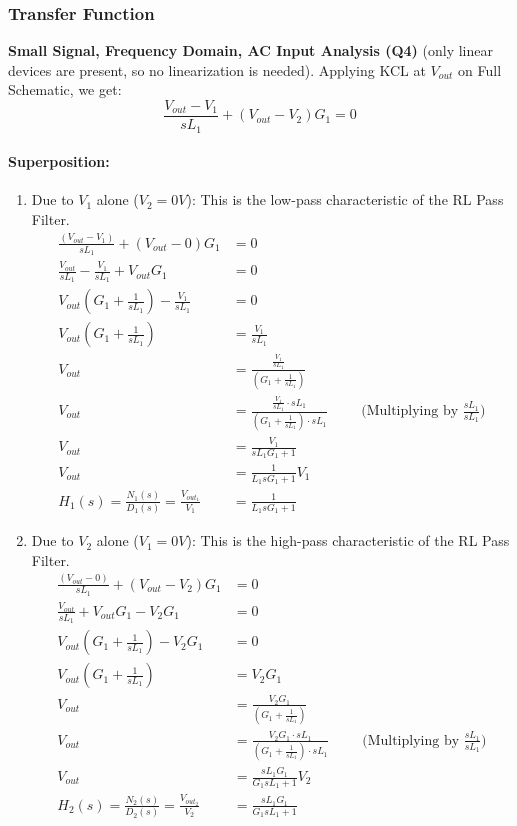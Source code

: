 \subsubsection{Transfer Function}
\textbf{Small Signal, Frequency Domain, AC Input Analysis (Q4)} (only
linear devices are present, so no linearization is needed). Applying KCL
at $V_{out}$ on Full Schematic, we get:
\[
  \frac{V_{out} - V_{1}}{sL_1} + (V_{out} - V_{2}){G_1} = 0
\]
\paragraph{Superposition:}
\begin{enumerate}
  \item Due to \(V_{1}\) alone (\(V_{2} = 0V\)):
    This is the low-pass characteristic of the RL Pass Filter.
    \begin{align*}
      \frac{(V_{out} - V_{1})}{sL_1} + (V_{out} - 0){G_1} &= 0 \\
      \frac{V_{out}}{sL_1} - \frac{V_{1}}{sL_1} + V_{out}G_1 &= 0 \\
      V_{out}(G_1 + \frac{1}{sL_1}) - \frac{V_{1}}{sL_1} &= 0 \\
      V_{out}(G_1 + \frac{1}{sL_1}) &= \frac{V_{1}}{sL_1} \\
      V_{out} &= \frac{\frac{V_{1}}{sL_1}}{(G_1 + \frac{1}{sL_1})} \\
      V_{out} &= \frac{\frac{V_{1}}{sL_1} \cdot sL_1}{(G_1 + \frac{1}{sL_1}) \cdot sL_1} \hspace{1cm} \text{(Multiplying by \(\frac{sL_1}{sL_1}\))} \\
      V_{out} &= \frac{V_{1}}{sL_1 G_1 + 1} \\
      V_{out} &= \frac{1}{L_1 s G_1 + 1}V_{1} \\
      H_1(s) = \frac{N_1(s)}{D_1(s)} = \frac{V_{out_1}}{V_{1}} &= \frac{1}{L_1 s G_1 + 1}
    \end{align*}
  \item Due to \(V_{2}\) alone (\(V_{1} = 0V\)):
    This is the high-pass characteristic of the RL Pass Filter.
    \begin{align*}
      \frac{(V_{out} - 0)}{sL_1} + (V_{out} - V_{2}){G_1} &= 0 \\
      \frac{V_{out}}{sL_1} + V_{out}G_1 - V_{2}G_1 &= 0 \\
      V_{out}(G_1 + \frac{1}{sL_1}) - V_{2}G_1 &= 0 \\
      V_{out}(G_1 + \frac{1}{sL_1}) &= V_{2}G_1 \\
      V_{out} &= \frac{V_{2}G_1}{(G_1 + \frac{1}{sL_1})} \\
      V_{out} &= \frac{V_{2}G_1 \cdot sL_1}{(G_1 + \frac{1}{sL_1}) \cdot sL_1} \hspace{1cm} \text{(Multiplying by \(\frac{sL_1}{sL_1}\))} \\
      V_{out} &= \frac{sL_1 G_1}{G_1 s L_1 + 1}V_{2} \\
      H_2(s) = \frac{N_2(s)}{D_2(s)} = \frac{V_{out_2}}{V_{2}} &= \frac{sL_1 G_1}{G_1 s L_1 + 1}
    \end{align*}
\end{enumerate}
